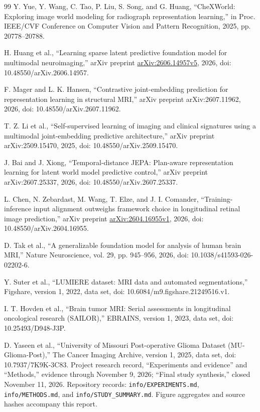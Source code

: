 \begin{singlespace}
\begin{thebibliography}{99}
 Y. Yue, Y. Wang, C. Tao, P. Liu, S. Song, and G. Huang, “CheXWorld: Exploring image world modeling for radiograph representation learning,” in Proc. IEEE/CVF Conference on Computer Vision and Pattern Recognition, 2025, pp. 20778–20788.

 H. Huang et al., “Learning sparse latent predictive foundation model for multimodal neuroimaging,” arXiv preprint \href{https://arxiv.org/abs/2606.14957v5}{arXiv:2606.14957v5}, 2026, doi: 10.48550/arXiv.2606.14957.

 F. Mager and L. K. Hansen, “Contrastive joint-embedding prediction for representation learning in structural MRI,” arXiv preprint arXiv:2607.11962, 2026, doi: 10.48550/arXiv.2607.11962.

 T. Z. Li et al., “Self-supervised learning of imaging and clinical signatures using a multimodal joint-embedding predictive architecture,” arXiv preprint arXiv:2509.15470, 2025, doi: 10.48550/arXiv.2509.15470.

 J. Bai and J. Xiong, “Temporal-distance JEPA: Plan-aware representation learning for latent world model predictive control,” arXiv preprint arXiv:2607.25337, 2026, doi: 10.48550/arXiv.2607.25337.

 L. Chen, N. Zebardast, M. Wang, T. Elze, and J. I. Comander, “Training-inference input alignment outweighs framework choice in longitudinal retinal image prediction,” arXiv preprint \href{https://arxiv.org/abs/2604.16955v1}{arXiv:2604.16955v1}, 2026, doi: 10.48550/arXiv.2604.16955.

 D. Tak et al., “A generalizable foundation model for analysis of human brain MRI,” Nature Neuroscience, vol. 29, pp. 945–956, 2026, doi: 10.1038/s41593-026-02202-6.

 Y. Suter et al., “LUMIERE dataset: MRI data and automated segmentations,” Figshare, version 1, 2022, data set, doi: 10.6084/m9.figshare.21249516.v1.

 I. T. Hovden et al., “Brain tumor MRI: Serial assessments in longitudinal oncological research (SAILOR),” EBRAINS, version 1, 2023, data set, doi: 10.25493/D948-J3P.

 D. Yaseen et al., “University of Missouri Post-operative Glioma Dataset (MU-Glioma-Post),” The Cancer Imaging Archive, version 1, 2025, data set, doi: 10.7937/7K9K-3C83.
 Project research record, ``Experiments and evidence'' and ``Methods,'' evidence through November 9, 2026; ``Final study synthesis,'' closed November 11, 2026. Repository records: \texttt{info/EXPERIMENTS.md}, \texttt{info/METHODS.md}, and \texttt{info/STUDY\_SUMMARY.md}. Figure aggregates and source hashes accompany this report.
\end{thebibliography}\end{singlespace}
